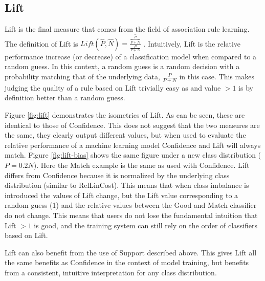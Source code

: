 \FloatBarrier
\subsection{Lift}

Lift is the final measure that comes from the field of association rule learning. The definition of Lift is
$Lift(\hat P, \hat N) = \frac{\frac{\hat P}{\hat P+\hat N}}{\frac{P}{P+ N}}$
. Intuitively, Lift is the relative performance increase (or decrease) of a classification model when compared to a random guess. In this context, a random guess is a random decision with a probability matching that of the underlying data, $\frac{P}{P+N}$ in this case. This makes judging the quality of a rule based on Lift trivially easy as and value $>1$ is by definition better than a random guess. 

Figure \ref{fig:lift} demonstrates the isometrics of Lift. As can be seen, these are identical to those of Confidence. This does not suggest that the two measures are the same, they clearly output different values, but when used to evaluate the relative performance of a machine learning model Confidence and Lift will always match.
Figure \ref{fig:lift-bias} shows the same figure under a new class distribution ($P = 0.2 N$). 
Here the Match example is the same as used with Confidence. Lift differs from Confidence because it is normalized by the underlying class distribution (similar to RelLinCost). This means that when class imbalance is introduced the values of Lift change, but the Lift value corresponding to a random guess (1) and the relative values between the Good and Match classifier do not change. This means that users do not lose the fundamental intuition that Lift $> 1$ is good, and the training system can still rely on the order of classifiers based on Lift.

Lift can also benefit from the use of Support described above. This gives Lift all the same benefits as Confidence in the context of model training, but benefits from a consistent, intuitive interpretation for any class distribution.

